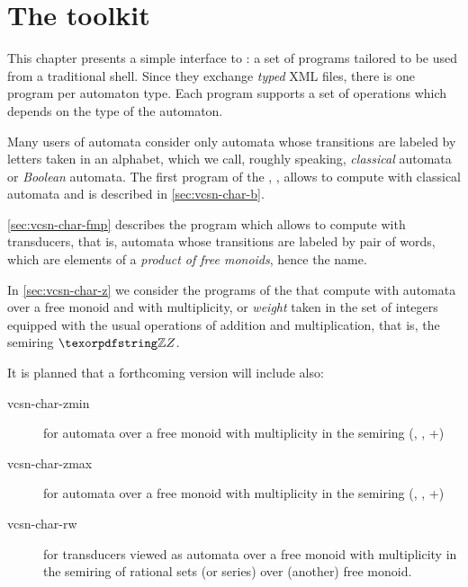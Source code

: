 \chapter{The \Vauc toolkit}
\label{sec:tafkit}

This chapter presents a simple interface to \Vauc: a set of programs
tailored to be used from a traditional shell.  Since they exchange
\emph{typed} XML files, there is one program per automaton type.  Each
program supports a set of operations which depends on the type of the
automaton.

Many users of automata consider only automata whose transitions are
labeled by letters taken in an alphabet, which we call, roughly
speaking, \emph{classical} automata or \emph{Boolean} automata.  The
first program of the \tafkit, , allows to compute with
classical automata and is described in \autoref{sec:vcsn-char-b}.

\autoref{sec:vcsn-char-fmp} describes the program  which
allows to compute with transducers, that is, automata whose
transitions are labeled by pair of words, which are elements of a
\emph{product of free monoids}, hence the name.

In \autoref{sec:vcsn-char-z} we consider the programs of the \tafkit that
compute with automata over a free monoid and with multiplicity, or
\emph{weight} taken in the set of integers equipped with the usual
operations of addition and multiplication, that is, the semiring $\Z$.


\medskip


It is planned that a forthcoming version will include also:

\begin{description}
\item[vcsn-char-zmin] for automata over a free monoid with multiplicity in
  the semiring (\Z, \min, +)

\item[vcsn-char-zmax] for automata over a free monoid with multiplicity in the
  semiring (\Z, \max, +)

\item[vcsn-char-rw] for transducers viewed as automata over a free
  monoid with multiplicity in the semiring of rational sets (or
  series) over (another) free monoid.
\end{description}

